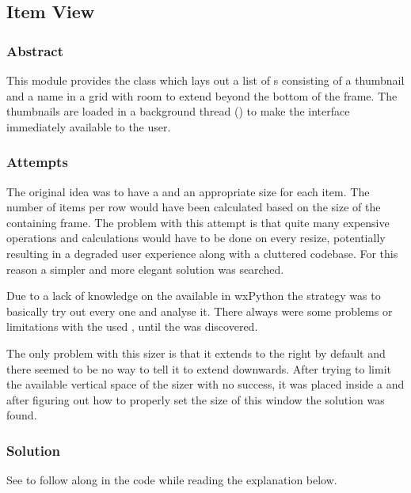 \subsection{Item View}%
\label{subsec:mod:itemview}
\def\kapitelautor{Clemens Stadlbauer}

\subsubsection{Abstract}
This module provides the  class which lays out a list of
s consisting of a thumbnail and a name in a grid with room to
extend beyond the bottom of the frame. The thumbnails are loaded in a
background thread () to make the interface immediately
available to the user.

\subsubsection{Attempts}
The original idea was to have a  and an appropriate size for
each item. The number of items per row would have been calculated based on the
size of the containing frame. The problem with this attempt is that quite many
expensive operations and calculations would have to be done on every resize,
potentially resulting in a degraded user experience along with a cluttered
codebase. For this reason a simpler and more elegant solution was searched.

Due to a lack of knowledge on the available  in
wxPython the strategy was to basically try out every one and
analyse it. There always were some problems or limitations with the used
, until the  was discovered.

The only problem with this sizer is that it extends to the right by default
and there seemed to be no way to tell it to extend downwards. After trying
to limit the available vertical space of the sizer with no success, it was
placed inside a  and after figuring out how to properly
set the size of this window the solution was found.

\subsubsection{Solution} %

See  to follow along in the code while
reading the explanation below.

